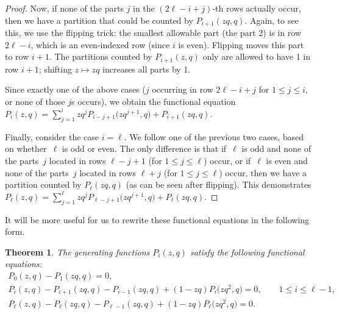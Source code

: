 \documentclass[pdftex]{sigma}
\numberwithin{equation}{section}
\newtheorem{Theorem}{Theorem}[section]
\theoremstyle{definition}
\begin{document}
\begin{proof}
Now, if none of the parts $j$ in the $(2\ell-i+j)$-th rows actually occur, then we have a partition that could be counted by $P_{i+1}(zq,q)$. Again, to see this, we use the flipping trick: the smallest allowable part (the part 2) is in row $2\ell-i$, which is an even-indexed row (since $i$ is even). Flipping moves this part to row $i+1$. The partitions counted by $P_{i+1}(z,q)$ only are allowed to have 1 in row $i+1$; shifting $z\mapsto zq$ increases all parts by 1.

Since exactly one of the above cases ($j$ occurring in row $2\ell-i+j$ for $1 \le j \le i$, or none of those $j$s occurs), we obtain the functional equation $P_i(z,q) = \sum_{j=1}^i zq^j P_{i-j+1}\bigl(zq^{j+1},q\bigr)+ P_{i+1}(zq,q)$.

Finally, consider the case $i=\ell$. We follow one of the previous two cases, based on whether~$\ell$ is odd or even. The only difference is that if~$\ell$ is odd and none of the parts~$j$ located in rows $\ell-j+1$ (for $1\le j \le \ell$) occur, or if~$\ell$ is even and none of the parts~$j$ located in rows $\ell+j$ (for $1\le j \le \ell$) occur, then we have a partition counted by $P_{\ell}(zq,q)$ (as can be seen after flipping). This demonstrates $P_\ell(z,q) = \sum_{j=1}^\ell zq^j P_{\ell-j+1}\bigl(zq^{j+1},q\bigr) + P_\ell(zq,q)$.
\end{proof}

It will be more useful for us to rewrite these functional equations in the following form.
\begin{Theorem} \label{thm:streamlinedPeqs}
The generating functions $P_i(z,q)$ satisfy the following functional equations:
\begin{gather}P_0(z,q)-P_1(zq,q) =0,
\label{eq:newPrec1} \\
P_i(z,q) - P_{i+1}(zq,q) - P_{i-1}(zq,q) + (1-zq)P_{i}\bigl(zq^2,q\bigr) =0, \qquad 1 \le i \le \ell-1, \label{eq:newPrec2} \\
P_\ell(z,q) - P_\ell(zq,q) -P_{\ell-1}(zq,q) + (1-zq) P_{\ell}\bigl(zq^2,q\bigr) = 0. \label{eq:newPrec3}
\end{gather}
\end{Theorem}
\end{document}
